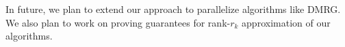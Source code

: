 \documentclass[sigconf]{acmart}
\begin{document}
In future, we plan to extend our approach to parallelize algorithms like DMRG. We also plan to work on proving guarantees for rank-$r_k$ approximation of our algorithms.











\appendix
\end{document}
